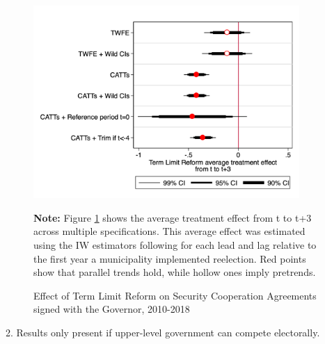 \documentclass[12pt]{amsart}
\numberwithin{equation}{section}
\theoremstyle{definition}
\theoremstyle{definition}
\theoremstyle{definition}
\begin{document}
\begin{figure}[H]   
\centering
 \caption{Effect of Term Limit Reform on Security Cooperation Agreements signed with the Governor, 2010-2018}
 \label{fig:robustness_agreements}
\includegraphics[width=0.9\textwidth]{../Figures/average_effects.png}
       \captionsetup{justification=centering}
       
 \textbf{Note:} Figure \ref{fig:robustness_agreements} shows the average treatment effect from t to t+3 across multiple specifications. This average effect was estimated using the IW estimators following \citet{abraham_sun_2020} for each lead and lag relative to the first year a municipality implemented reelection. Red points show that parallel trends hold, while hollow ones imply pretrends. 
\end{figure}   

2. Results only present if upper-level government can compete electorally. 
\end{document}
